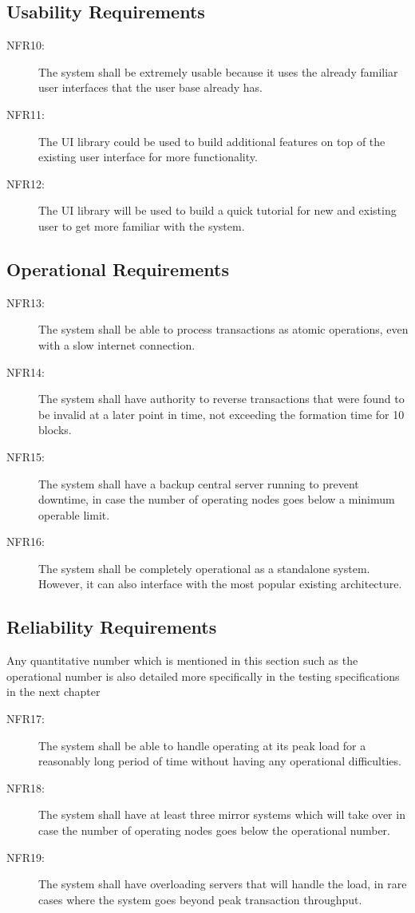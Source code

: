 \documentclass[a4paper,twoside,phd]{BYUPhys}
\begin{document}
\subsection{Usability Requirements}
\begin{description}
\item[NFR10:] The system shall be extremely usable because it uses the already familiar user interfaces that the user base already has.
\item[NFR11:] The UI library could be used to build additional features on top of the existing user interface for more functionality.
\item[NFR12:] The UI library will be used to build a quick tutorial for new and existing user to get more familiar with the system.
\end{description}
\subsection{Operational Requirements}
\begin{description}
\item[NFR13:] The system shall be able to process transactions as atomic operations, even with a slow internet connection.
\item[NFR14:] The system shall have authority to reverse transactions that were found to be invalid at a later point in time, not exceeding the formation time for 10 blocks.
\item[NFR15:] The system shall have a backup central server running to prevent downtime, in case the number of operating nodes goes below a minimum operable limit.
\item[NFR16:] The system shall be completely operational as a standalone system. However, it can also interface with the most popular existing architecture.
\end{description}
\subsection{Reliability Requirements}
Any quantitative number which is mentioned in this section such as the operational number is also detailed more specifically in the testing specifications in the next chapter
\begin{description}
\item[NFR17:] The system shall be able to handle operating at its peak load for a reasonably long period of time without having any operational difficulties.
\item[NFR18:] The system shall have at least three mirror systems which will take over in case the number of operating nodes goes below the operational number. 
\item[NFR19:] The system shall have overloading servers that will handle the load, in rare cases where the system goes beyond peak transaction throughput.
\end{description}
\end{document}
